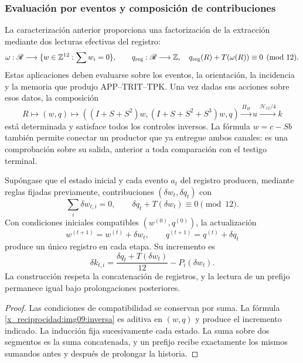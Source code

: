 \subsubsection{Evaluación por eventos y composición de contribuciones}

La caracterización anterior proporciona una factorización de la extracción mediante dos
lecturas efectivas del registro:
\begin{equation}
 \omega:\mathscr R\longrightarrow
 \{w\in\mathbb Z^{12}:\sum w_i=0\},\qquad
 q_{\rm reg}:\mathscr R\longrightarrow\mathbb Z,
 \quad q_{\rm reg}(R)+T(\omega(R))\equiv0\pmod {12}.
 \label{x_reciprocidad:img09:contrato-productor}
\end{equation}
Estas aplicaciones deben evaluarse sobre los eventos, la orientación,
la incidencia y la memoria que produjo APP--TRIT--TPK. Una vez dadas sus
acciones sobre esos datos, la composición
\[
 R\longmapsto(w,q)\longmapsto
 ((I+S+S^2)w,(I+S+S^2+S^3)w,q)
 \xrightarrow{\Pi_H}u\xrightarrow{\mathcal H_{12}/4}k
\]
está determinada y satisface todos los controles inversos. La fórmula
$w=c-Sb$ también permite conectar un productor que ya entregue ambos
canales: es una comprobación sobre su salida, anterior a toda comparación
con el testigo terminal.

\begin{proposition}
\label{x_reciprocidad:img09:acumulacion}
Supóngase que el estado inicial y cada evento $a_t$ del registro
producen, mediante reglas fijadas previamente, contribuciones
$(\delta w_t,\delta q_t)$ con
\[
 \sum_i\delta w_{t,i}=0,\qquad
 \delta q_t+T(\delta w_t)\equiv0\pmod {12}.
\]
Con condiciones iniciales compatibles $(w^{(0)},q^{(0)})$, la
actualización
\[
 w^{(t+1)}=w^{(t)}+\delta w_t,\qquad
 q^{(t+1)}=q^{(t)}+\delta q_t
\]
produce un único registro en cada etapa. Su incremento es
\[
 \delta k_{t,i}=
 \frac{\delta q_t+T(\delta w_t)}{12}-P_i(\delta w_t).
\]
La construcción respeta la concatenación de registros, y la lectura
de un prefijo permanece igual bajo prolongaciones posteriores.
\end{proposition}
\begin{proof}
Las condiciones de compatibilidad se conservan por suma. La fórmula
\eqref{x_reciprocidad:img09:inversa} es aditiva en $(w,q)$ y produce el
incremento indicado. La inducción fija sucesivamente cada estado.
La suma sobre dos segmentos es la suma concatenada, y un prefijo recibe
exactamente los mismos sumandos antes y después de prolongar la historia.
\end{proof}


